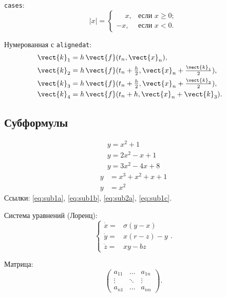 \documentclass[font=modern]{cmcmsuthesis-cw}
\begin{document}
\texttt{cases}:
\[|x|=\begin{cases}\phantom{-}x,&\text{если }x\geqslant 0;\\
-x,&\text{если }x<0.\end{cases}\]

Нумерованная с \texttt{alignedat}:
\begin{equation}\label{eq:rk}
\begin{alignedat}{2}
\vect{k}_1 &= h\,\vect{f}(t_n,\vect{x}_n), &\quad&\\
\vect{k}_2 &= h\,\vect{f}(t_n+\tfrac{h}{2},
    \vect{x}_n+\tfrac{\vect{k}_1}{2}), &&\\
\vect{k}_3 &= h\,\vect{f}(t_n+\tfrac{h}{2},
    \vect{x}_n+\tfrac{\vect{k}_2}{2}), &&\\
\vect{k}_4 &= h\,\vect{f}(t_n+h,\vect{x}_n+\vect{k}_3).&&
\end{alignedat}
\end{equation}

\subsection{Субформулы}
\begin{subequations}\label{eq:sub1}
\begin{gather}
y = x^2+1 \label{eq:sub1a}\\
y = 2x^2-x+1 \label{eq:sub1b}\\
y = 3x^2-4x+8 \label{eq:sub1c}
\end{gather}
\end{subequations}
\begin{subequations}\label{eq:sub2}
\begin{align}
y &= x^3+x^2+x+1 \label{eq:sub2a}\\
y &= x^2 \label{eq:sub2b}
\end{align}
\end{subequations}
Ссылки: \eqref{eq:sub1a}, \eqref{eq:sub1b}, \eqref{eq:sub2a}, \eqref{eq:sub1c}.

Система уравнений (Лоренц):
\[\left\{\begin{array}{rl}
\dot x=&\sigma(y-x)\\\dot y=&x(r-z)-y\\\dot z=&xy-bz
\end{array}\right..\]

Матрица:
\[\left(\begin{array}{ccc}
a_{11}&\ldots&a_{1n}\\\vdots&\ddots&\vdots\\a_{n1}&\ldots&a_{nn}
\end{array}\right).\]
\end{document}
